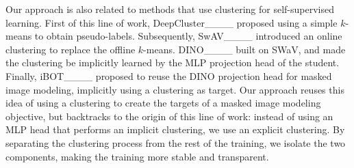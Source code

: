 Our approach is also related to methods that use clustering for self-supervised learning.
First of this line of work, DeepCluster____ proposed using a simple $k$-means to obtain pseudo-labels.
Subsequently, SwAV____ introduced an online clustering to replace the offline $k$-means.
DINO____ built on SWaV, and made the clustering be implicitly learned by the MLP projection head of the student.
Finally, iBOT____ proposed to reuse the DINO projection head for masked image modeling, implicitly using a clustering as target.
Our approach reuses this idea of using a clustering to create the targets of a masked image modeling objective, but backtracks to the origin of this line of work: instead of using an MLP head that performs an implicit clustering, we use an explicit clustering.
By separating the clustering process from the rest of the training, we isolate the two components, making the training more stable and transparent.